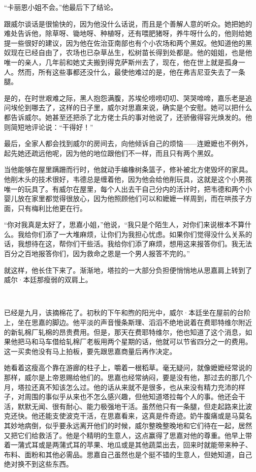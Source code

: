 \par “卡丽恩小姐不会。”他最后下了结论。
\par 跟威尔谈话是很愉快的，因为他没什么话说，而且是个善解人意的听众。她把她的难处告诉他，除草呀、锄地呀、种植呀，还有喂肥猪呀，养牛呀什么的，他则给她提一些很好的建议，因为他在佐治亚南部也有个小农场和两个黑奴。他知道他的黑奴现在已经自由了，农场也已杂草丛生，松树苗长得到处都是。他的姐姐，也是他唯一的亲人，几年前和她丈夫搬到得克萨斯州去了，现在，他在世上就是孤身一人。然而，所有这些事都还没什么，最使他难过的是，他在弗吉尼亚失去了一条腿。
\par 是的，在时世艰难之际，黑人抱怨满腹，苏埃伦唠唠叨叨、哭哭啼啼，嘉乐老是追问埃伦到哪去了，这样的日子里，威尔对思嘉来说，确实是个安慰。她可以把什么都告诉威尔。她甚至还把杀了北方佬士兵的事对他说了，还骄傲得容光焕发的。他则简短地评论说：“干得好！”
\par 最后，全家人都会找到威尔的房间去，向他倾诉自己的烦恼——连嬷嬷也不例外，起先她还疏远他呢，因为他的地位跟他们不一样，而且只有两个黑奴。
\par 当他能够在屋里蹒跚而行时，他就动手编橡树条篮子，修补被北方佬毁坏的家具。他削木头的技术很好，韦德总是缠着他，因为他会给他削玩具，这就是这个小男孩唯一的玩具了。有威尔在屋里，每个人出去干自己分内的活计时，把韦德和两个小婴儿放在家里都觉得很放心，因为他照顾他们可以和嬷嬷一样周到，而在哄孩子方面，只有梅利比他更在行。
\par “你对我真是太好了，思嘉小姐，”他说，“我只是个陌生人，对你们来说根本不算什么。我给你们添了一大堆麻烦，让你们为我担心忧虑。如果你们觉得没什么关系的话，我想待在这，帮你们干些活。我给你们添了麻烦，想用这来报答你们。我无法百分之百地报答你们，因为救命之恩是一个男人报答不完的。”
\par 就这样，他长住下来了。渐渐地，塔拉的一大部分负担便悄悄地从思嘉肩上转到了威尔·本廷那瘦弱的双肩上。
\par  
\par 已经是九月，该摘棉花了。初秋的下午和煦的阳光中，威尔·本廷坐在屋前的台阶上，坐在思嘉的脚边。他平淡的声音慢条斯理、滔滔不绝地说着在费耶特维尔附近的新轧棉厂轧棉的昂贵费用。但是，那天在费耶特维尔，他也知道了这个消息，如果他把马和马车借给轧棉厂老板用两个星期的话，他就可以节省四分之一的费用。这一买卖他没有马上拍板，要先跟思嘉商量后再作决定。
\par 她看着这瘦高个靠在游廊的柱子上，嚼着一根稻草。毫无疑问，就像嬷嬷经常说的那样，威尔是上帝恩赐给他们的。思嘉也经常纳闷，要是没有他，那过去的那几个月，塔拉还真不知该怎么过。他的话从来就不是很多，也从来没有精力充沛的样子，对周围的事似乎从来也不怎么感兴趣，但他知道塔拉每个人的事。他还会干活，默默无闻、很有耐心、能力极强地干活。虽然他只有一条腿，但走起路来比波克还快。他还能支使波克干活，在思嘉看来，这真是件奇迹。奶牛腹痛或是马莫名其妙地病倒，似乎要永远离开他们的时候，威尔整晚整晚地和它们待在一起，居然又把它们给救活了。他是个精明的生意人，这点赢得了思嘉对他的尊重。他早上带着一蒲式耳或是两蒲式耳的苹果、地瓜或是其他蔬菜出去，回来时就能带来种子、布料、面粉和其他必需品。思嘉自己虽然也是个挺不错的生意人，但她知道，自己绝对换不到这些东西。
